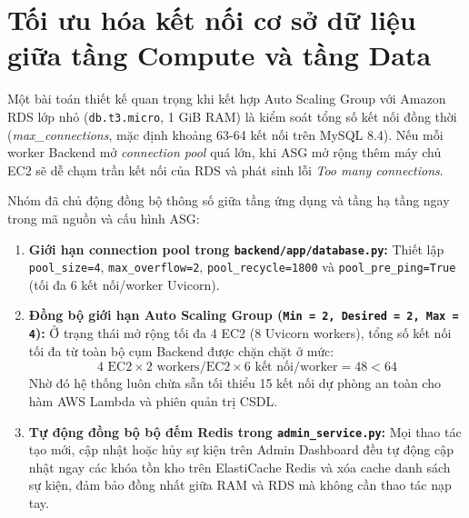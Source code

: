 

\section{Tối ưu hóa kết nối cơ sở dữ liệu giữa tầng Compute và tầng Data}
Một bài toán thiết kế quan trọng khi kết hợp Auto Scaling Group với Amazon RDS lớp nhỏ (\texttt{db.t3.micro}, 1 GiB RAM) là kiểm soát tổng số kết nối đồng thời (\textit{max\_connections}, mặc định khoảng 63-64 kết nối trên MySQL 8.4). Nếu mỗi worker Backend mở \textit{connection pool} quá lớn, khi ASG mở rộng thêm máy chủ EC2 sẽ dễ chạm trần kết nối của RDS và phát sinh lỗi \textit{Too many connections}.

Nhóm đã chủ động đồng bộ thông số giữa tầng ứng dụng và tầng hạ tầng ngay trong mã nguồn và cấu hình ASG:
\begin{enumerate}[leftmargin=1.5em]
  \item \textbf{Giới hạn connection pool trong \texttt{backend/app/database.py}:} Thiết lập \texttt{pool\_size=4}, \texttt{max\_overflow=2}, \texttt{pool\_recycle=1800} và \texttt{pool\_pre\_ping=True} (tối đa 6 kết nối/worker Uvicorn).
  \item \textbf{Đồng bộ giới hạn Auto Scaling Group (\texttt{Min = 2, Desired = 2, Max = 4}):} Ở trạng thái mở rộng tối đa 4 EC2 (8 Uvicorn workers), tổng số kết nối tối đa từ toàn bộ cụm Backend được chặn chặt ở mức:
  \[
    4 \text{ EC2} \times 2 \text{ workers/EC2} \times 6 \text{ kết nối/worker} = 48 < 64
  \]
  Nhờ đó hệ thống luôn chừa sẵn tối thiểu 15 kết nối dự phòng an toàn cho hàm AWS Lambda và phiên quản trị CSDL.
  \item \textbf{Tự động đồng bộ bộ đếm Redis trong \texttt{admin\_service.py}:} Mọi thao tác tạo mới, cập nhật hoặc hủy sự kiện trên Admin Dashboard đều tự động cập nhật ngay các khóa tồn kho trên ElastiCache Redis và xóa cache danh sách sự kiện, đảm bảo đồng nhất giữa RAM và RDS mà không cần thao tác nạp tay.
\end{enumerate}

